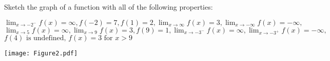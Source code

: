 \documentclass[nooutcomes]{ximera}
\begin{document}
\begin{problem}	
Sketch the graph of a function with all of the following properties:

	$\lim_{x \to -2^-} f(x) = \infty, 
	f(-2) = 7, 
	f(1) = 2, 
	\lim_{x \to \infty} f(x) = 3, 
	\lim_{x \to -\infty} f(x) = -\infty,$
\newline 
	$\lim_{x \to 5} f(x) = \infty, 
	\lim_{x \to 9} f(x) = 3,  
	f(9) = 1,  
	\lim_{x \to -3^-} f(x) = \infty,  
	\lim_{x \to -3^+} f(x) = -\infty,$
\newline  
	$f(4) \text{ is undefined, }
	f(x) = 3 \text{ for } x>9  $
	
		\begin{freeResponse}
			\begin{image}
			\texttt{[image: Figure2.pdf]}
			\end{image}
		\end{freeResponse}
\end{problem}
\end{document}
